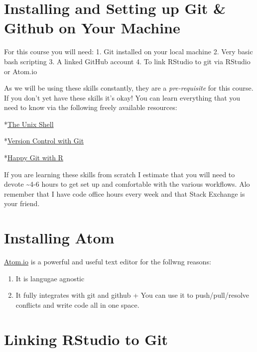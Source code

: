 \documentclass[]{book}
\begin{document}
\hypertarget{installing-and-setting-up-git-github-on-your-machine}{%
\section{Installing and Setting up Git \& Github on Your Machine}\label{installing-and-setting-up-git-github-on-your-machine}}

For this course you will need:
1. Git installed on your local machine
2. Very basic bash scripting
3. A linked GitHub account
4. To link RStudio to git via RStudio or Atom.io

As we will be using these skills constantly, they are a \emph{pre-requisite} for this course. If you don't yet have these skills it's okay! You can learn everything that you need to know via the following freely available resources:

*\href{http://swcarpentry.github.io/shell-novice}{The Unix Shell}

*\href{http://swcarpentry.github.io/git-novice}{Version Control with Git}

*\href{https://happygitwithr.com/}{Happy Git with R}

If you are learning these skills from scratch I estimate that you will need to devote \textasciitilde{}4-6 hours to get set up and comfortable with the various workflows. Alo remember that I have code office hours every week and that Stack Exchange is your friend.

\hypertarget{installing-atom}{%
\section{Installing Atom}\label{installing-atom}}

\href{https://atom.io/}{Atom.io} is a powerful and useful text editor for the follwng reasons:

\begin{enumerate}
\def\labelenumi{\arabic{enumi}.}
\item
  It is langugae agnostic
\item
  It fully integrates with git and github
  + You can use it to push/pull/resolve conflicts and write code all in one space.
\end{enumerate}

\hypertarget{linking-rstudio-to-git}{%
\section{Linking RStudio to Git}\label{linking-rstudio-to-git}}
\end{document}
